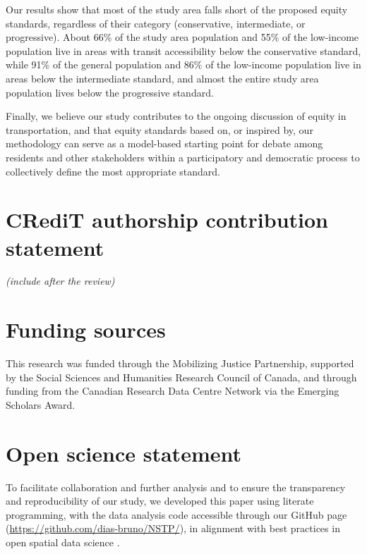 \documentclass[preprint, 3p,
authoryear]{elsarticle} %
\begin{document}
Our results show that most of the study area falls short of the proposed
equity standards, regardless of their category (conservative,
intermediate, or progressive). About 66\% of the study area population
and 55\% of the low-income population live in areas with transit
accessibility below the conservative standard, while 91\% of the general
population and 86\% of the low-income population live in areas below the
intermediate standard, and almost the entire study area population lives
below the progressive standard.

Finally, we believe our study contributes to the ongoing discussion of
equity in transportation, and that equity standards based on, or
inspired by, our methodology can serve as a model-based starting point
for debate among residents and other stakeholders within a participatory
and democratic process to collectively define the most appropriate
standard.

\section*{CRediT authorship contribution
statement}\label{credit-authorship-contribution-statement}

\emph{(include after the review)}

\section*{Funding sources}\label{funding-sources}

This research was funded through the Mobilizing Justice Partnership,
supported by the Social Sciences and Humanities Research Council of
Canada, and through funding from the Canadian Research Data Centre
Network via the Emerging Scholars Award.

\section*{Open science statement}\label{open-science-statement}

To facilitate collaboration and further analysis and to ensure the
transparency and reproducibility of our study, we developed this paper
using literate programming, with the data analysis code accessible
through our GitHub page (\url{https://github.com/dias-bruno/NSTP/}), in
alignment with best practices in open spatial data science
\citep{páez2021, arribas-bel2021}.
\end{document}
